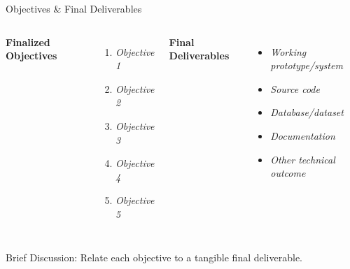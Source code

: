 \documentclass[aspectratio=169,11pt]{beamer}
\newcommand{\smallnote}[1]{%
\vspace{0.08cm}
{\scriptsize\color{GEUGrey}#1}
}
\newcommand{\placeholder}[1]{%
\textit{\color{GEUGrey}#1}
}
\begin{document}
\begin{frame}{Objectives \& Final Deliverables}

\begin{columns}[T,totalwidth=\textwidth]


\textbf{\color{GEUBlue}Finalized Objectives}

\begin{enumerate}\itemsep3pt
    \item \placeholder{Objective 1}
    \item \placeholder{Objective 2}
    \item \placeholder{Objective 3}
    \item \placeholder{Objective 4}
    \item \placeholder{Objective 5}
\end{enumerate}


\textbf{\color{GEUBlue}Final Deliverables}

\begin{itemize}\itemsep3pt
    \item \placeholder{Working prototype/system}
    \item \placeholder{Source code}
    \item \placeholder{Database/dataset}
    \item \placeholder{Documentation}
    \item \placeholder{Other technical outcome}
\end{itemize}

\end{columns}

\vfill

\smallnote{
Brief Discussion: Relate each objective to a tangible final deliverable.
}

\end{frame}
\end{document}
